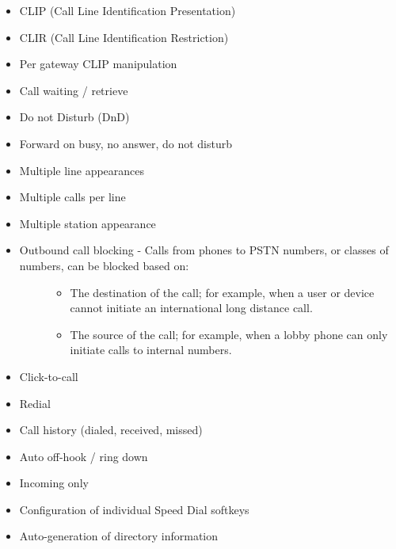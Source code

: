 \documentclass[letterpaper,10pt,english]{sphinxmanual}
\begin{document}
\begin{itemize}
\item {} 
CLIP (Call Line Identification Presentation)

\item {} 
CLIR (Call Line Identification Restriction)

\item {} 
Per gateway CLIP manipulation

\item {} 
Call waiting / retrieve

\item {} 
Do not Disturb (DnD)

\item {} 
Forward on busy, no answer, do not disturb

\item {} 
Multiple line appearances

\item {} 
Multiple calls per line

\item {} 
Multiple station appearance

\item {} \begin{description}
\item[{Outbound call blocking - Calls from phones to PSTN numbers, or classes of numbers, can be blocked based on:}] \leavevmode\begin{itemize}
\item {} 
The destination of the call; for example, when a user or device cannot initiate an international long distance call.

\item {} 
The source of the call; for example, when a lobby phone can only initiate calls to internal numbers.

\end{itemize}

\end{description}

\item {} 
Click-to-call

\item {} 
Redial

\item {} 
Call history (dialed, received, missed)

\item {} 
Auto off-hook / ring down

\item {} 
Incoming only

\item {} 
Configuration of individual Speed Dial softkeys

\item {} 
Auto-generation of directory information

\end{itemize}
\end{document}
